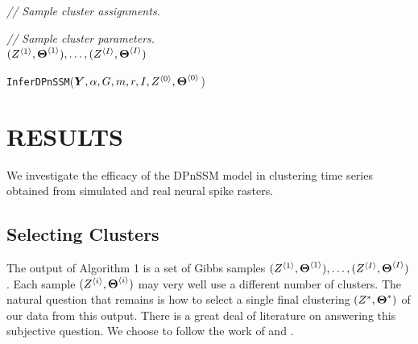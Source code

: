 \documentclass[twoside]{article}
\begin{document}
\begin{algorithm}
  \begin{algorithmic}[1]
	\item[\quad \quad \emph{// Sample cluster assignments.}]
		\EndFor
	\EndFor
	\item[\quad \quad \emph{// Sample cluster parameters.}]
		\EndFor
	\EndFor
  \EndFor \\
  \Return $(Z^{\langle1\rangle}_{}, \boldsymbol{\Theta}^{\langle1\rangle}_{}), \ldots, (Z^{\langle I\rangle}_{}, \boldsymbol{\Theta}^{\langle I\rangle}_{})$
  \end{algorithmic}
  \caption{\texttt{InferDPnSSM}($\boldsymbol{Y}, \alpha, G, m, r, I, Z^{\langle0\rangle}_{}, \boldsymbol{\Theta}^{\langle0\rangle}_{}$)} \label{alg}
\end{algorithm}


\section{RESULTS}
We investigate the efficacy of the DPnSSM model in clustering time series obtained from simulated and real neural spike rasters.

\subsection{Selecting Clusters} \label{ssec:sel-clust}
The output of Algorithm 1 is a set of Gibbs samples $(Z^{\langle1\rangle}_{}, \boldsymbol{\Theta}^{\langle1\rangle}_{}), \ldots, (Z^{\langle I\rangle}_{}, \boldsymbol{\Theta}^{\langle I\rangle}_{})$.  Each sample $(Z^{\langle i\rangle}_{}, \boldsymbol{\Theta}^{\langle i\rangle}_{})$ may very well use a different number of clusters.  The natural question that remains is how to select a single final clustering $(Z^*, \boldsymbol{\Theta}^*)$ of our data from this output.  There is a great deal of literature on answering this subjective question.  We choose to follow the work of \cite{dahl2006model} and \cite{nieto2014bayesian}.  
\end{document}
